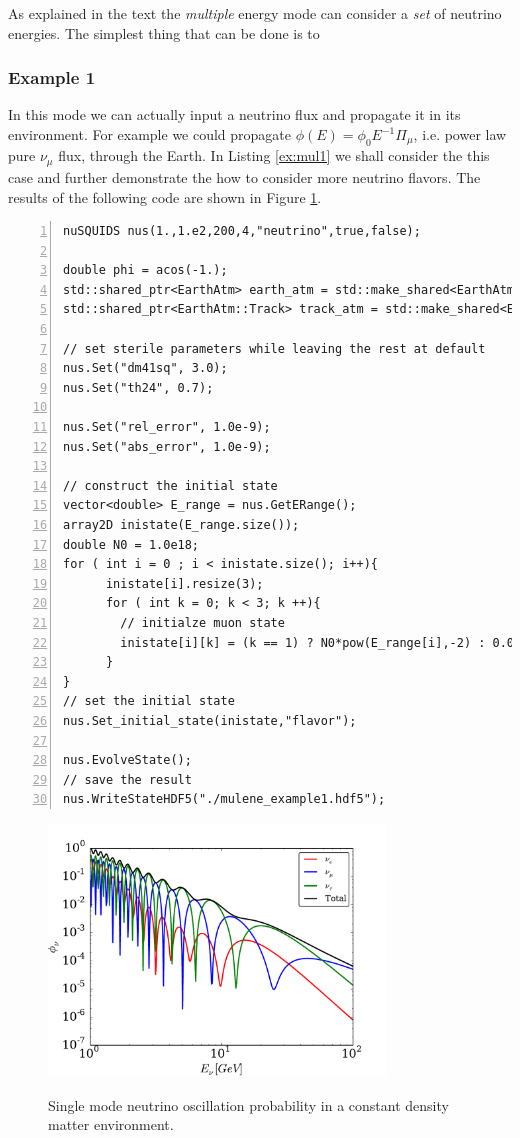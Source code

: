 \documentclass[3p,12pt]{elsarticle}
\begin{document}
As explained in the text the {\it multiple} energy mode can consider a {\it set} of neutrino energies. The simplest thing that can be done is to 

\subsubsection{Example 1}

In this mode we can actually input a neutrino flux and propagate it in its environment. For example we could propagate $\phi(E) = \phi_0 E^{-1} \Pi_\mu$, i.e. power law pure $\nu_\mu$ flux, through the Earth. In Listing \ref{ex:mul1} we shall consider the this case and further demonstrate the how to consider more neutrino flavors. The results of the following code are shown in Figure \ref{fig:sterile_osc}.

\begin{lstlisting}[frame=leftline, numbers = left,breaklines=true, label = ex:mul1]
nuSQUIDS nus(1.,1.e2,200,4,"neutrino",true,false);

double phi = acos(-1.);
std::shared_ptr<EarthAtm> earth_atm = std::make_shared<EarthAtm>();
std::shared_ptr<EarthAtm::Track> track_atm = std::make_shared<EarthAtm::Track>(phi);

// set sterile parameters while leaving the rest at default
nus.Set("dm41sq", 3.0);
nus.Set("th24", 0.7);

nus.Set("rel_error", 1.0e-9);
nus.Set("abs_error", 1.0e-9);

// construct the initial state
vector<double> E_range = nus.GetERange();
array2D inistate(E_range.size());
double N0 = 1.0e18;
for ( int i = 0 ; i < inistate.size(); i++){
      inistate[i].resize(3);
      for ( int k = 0; k < 3; k ++){
        // initialze muon state
        inistate[i][k] = (k == 1) ? N0*pow(E_range[i],-2) : 0.0;
      }
}
// set the initial state
nus.Set_initial_state(inistate,"flavor");

nus.EvolveState();
// save the result
nus.WriteStateHDF5("./mulene_example1.hdf5");
\end{lstlisting}

\begin{figure}[ht]
\begin{center}
\label{fig:sterile_osc}
\includegraphics[width=0.8\textwidth]{./fig/sterile_osc_demo.pdf}
\caption{Single mode neutrino oscillation probability in a constant density matter environment.}
\end{center}
\end{figure}
\end{document}
